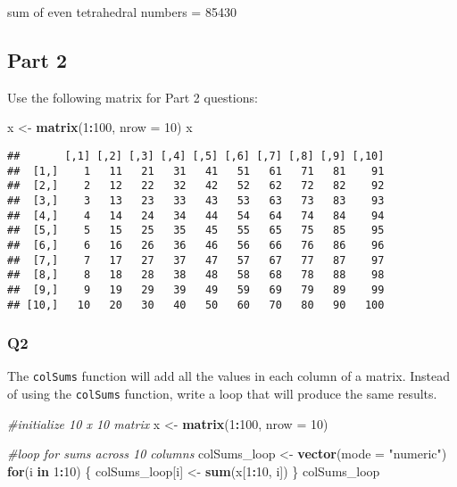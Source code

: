 \documentclass[
]{article}
\newenvironment{Shaded}{\begin{snugshade}}{\end{snugshade}}
\newcommand{\CommentTok}[1]{\textcolor[rgb]{0.56,0.35,0.01}{\textit{#1}}}
\newcommand{\ControlFlowTok}[1]{\textcolor[rgb]{0.13,0.29,0.53}{\textbf{#1}}}
\newcommand{\DataTypeTok}[1]{\textcolor[rgb]{0.13,0.29,0.53}{#1}}
\newcommand{\DecValTok}[1]{\textcolor[rgb]{0.00,0.00,0.81}{#1}}
\newcommand{\KeywordTok}[1]{\textcolor[rgb]{0.13,0.29,0.53}{\textbf{#1}}}
\newcommand{\NormalTok}[1]{#1}
\newcommand{\OperatorTok}[1]{\textcolor[rgb]{0.81,0.36,0.00}{\textbf{#1}}}
\newcommand{\StringTok}[1]{\textcolor[rgb]{0.31,0.60,0.02}{#1}}
\begin{document}
sum of even tetrahedral numbers = 85430

\hypertarget{part-2}{%
\subsection{Part 2}\label{part-2}}

Use the following matrix for Part 2 questions:

\begin{Shaded}
\begin{Highlighting}[]
\NormalTok{x <-}\StringTok{ }\KeywordTok{matrix}\NormalTok{(}\DecValTok{1}\OperatorTok{:}\DecValTok{100}\NormalTok{, }\DataTypeTok{nrow =} \DecValTok{10}\NormalTok{)}
\NormalTok{x}
\end{Highlighting}
\end{Shaded}

\begin{verbatim}
##       [,1] [,2] [,3] [,4] [,5] [,6] [,7] [,8] [,9] [,10]
##  [1,]    1   11   21   31   41   51   61   71   81    91
##  [2,]    2   12   22   32   42   52   62   72   82    92
##  [3,]    3   13   23   33   43   53   63   73   83    93
##  [4,]    4   14   24   34   44   54   64   74   84    94
##  [5,]    5   15   25   35   45   55   65   75   85    95
##  [6,]    6   16   26   36   46   56   66   76   86    96
##  [7,]    7   17   27   37   47   57   67   77   87    97
##  [8,]    8   18   28   38   48   58   68   78   88    98
##  [9,]    9   19   29   39   49   59   69   79   89    99
## [10,]   10   20   30   40   50   60   70   80   90   100
\end{verbatim}

\hypertarget{q2}{%
\subsubsection{Q2}\label{q2}}

The \texttt{colSums} function will add all the values in each column of
a matrix. Instead of using the \texttt{colSums} function, write a loop
that will produce the same results.

\begin{Shaded}
\begin{Highlighting}[]
\CommentTok{#initialize 10 x 10 matrix}
\NormalTok{x <-}\StringTok{ }\KeywordTok{matrix}\NormalTok{(}\DecValTok{1}\OperatorTok{:}\DecValTok{100}\NormalTok{, }\DataTypeTok{nrow =} \DecValTok{10}\NormalTok{)}

\CommentTok{#loop for sums across 10 columns}
\NormalTok{colSums_loop <-}\StringTok{ }\KeywordTok{vector}\NormalTok{(}\DataTypeTok{mode =} \StringTok{"numeric"}\NormalTok{)}
\ControlFlowTok{for}\NormalTok{(i }\ControlFlowTok{in} \DecValTok{1}\OperatorTok{:}\DecValTok{10}\NormalTok{) \{}
\NormalTok{  colSums_loop[i] <-}\StringTok{ }\KeywordTok{sum}\NormalTok{(x[}\DecValTok{1}\OperatorTok{:}\DecValTok{10}\NormalTok{, i])}
\NormalTok{\}}
\NormalTok{colSums_loop}
\end{Highlighting}
\end{Shaded}
\end{document}
